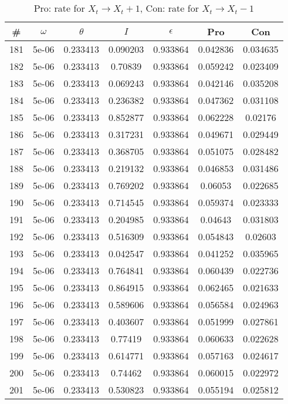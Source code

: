\newpage
\begin{table}
\caption{Pro: rate for $X_t \rightarrow X_t + 1$, Con: rate for $X_t \rightarrow X_t - 1$}
\begin{tabular*}{\linewidth}{c|c|c|c|c|c|c}
\# & $\omega$ & $\theta$ & $I$ & $\epsilon$ & Pro & Con \\
\hline
181 & 5e-06 & 0.233413 & 0.090203 & 0.933864 & 0.042836 & 0.034635\\
182 & 5e-06 & 0.233413 & 0.70839 & 0.933864 & 0.059242 & 0.023409\\
183 & 5e-06 & 0.233413 & 0.069243 & 0.933864 & 0.042146 & 0.035208\\
184 & 5e-06 & 0.233413 & 0.236382 & 0.933864 & 0.047362 & 0.031108\\
185 & 5e-06 & 0.233413 & 0.852877 & 0.933864 & 0.062228 & 0.02176\\
186 & 5e-06 & 0.233413 & 0.317231 & 0.933864 & 0.049671 & 0.029449\\
187 & 5e-06 & 0.233413 & 0.368705 & 0.933864 & 0.051075 & 0.028482\\
188 & 5e-06 & 0.233413 & 0.219132 & 0.933864 & 0.046853 & 0.031486\\
189 & 5e-06 & 0.233413 & 0.769202 & 0.933864 & 0.06053 & 0.022685\\
190 & 5e-06 & 0.233413 & 0.714545 & 0.933864 & 0.059374 & 0.023333\\
191 & 5e-06 & 0.233413 & 0.204985 & 0.933864 & 0.04643 & 0.031803\\
192 & 5e-06 & 0.233413 & 0.516309 & 0.933864 & 0.054843 & 0.02603\\
193 & 5e-06 & 0.233413 & 0.042547 & 0.933864 & 0.041252 & 0.035965\\
194 & 5e-06 & 0.233413 & 0.764841 & 0.933864 & 0.060439 & 0.022736\\
195 & 5e-06 & 0.233413 & 0.864915 & 0.933864 & 0.062465 & 0.021633\\
196 & 5e-06 & 0.233413 & 0.589606 & 0.933864 & 0.056584 & 0.024963\\
197 & 5e-06 & 0.233413 & 0.403607 & 0.933864 & 0.051999 & 0.027861\\
198 & 5e-06 & 0.233413 & 0.77419 & 0.933864 & 0.060633 & 0.022628\\
199 & 5e-06 & 0.233413 & 0.614771 & 0.933864 & 0.057163 & 0.024617\\
200 & 5e-06 & 0.233413 & 0.74462 & 0.933864 & 0.060015 & 0.022972\\
201 & 5e-06 & 0.233413 & 0.530823 & 0.933864 & 0.055194 & 0.025812\\

\end{tabular*}
\end{table}
